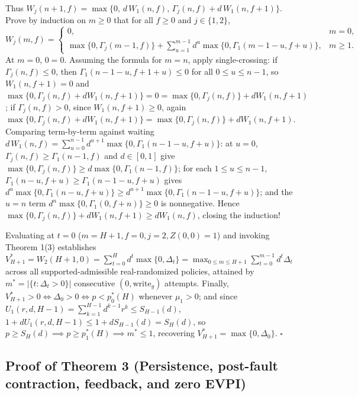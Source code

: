 \documentclass[11pt,a4paper]{article}
\begin{document}
Thus
\(W_j(n+1, f) = \max\{0,\, d\,W_1(n, f),\, \Gamma_j(n, f) + d\,W_1(n, f+1)\}\).
Prove by induction on \(m \ge 0\) that for all \(f \ge 0\) and
\(j \in \{1,2\}\),
\[W_j(m, f) = \begin{cases} 0, & m = 0, \\ \max\{0, \Gamma_j(m-1, f)\} + \sum_{u=1}^{m-1} d^u \max\{0, \Gamma_1(m - 1 - u, f + u)\}, & m \ge 1. \end{cases}\]
At \(m = 0\), \(0 = 0\). Assuming the formula for \(m = n\), apply
single-crossing: if \(\Gamma_j(n, f) \le 0\), then
\(\Gamma_1(n - 1 - u, f + 1 + u) \le 0\) for all \(0 \le u \le n - 1\),
so \(W_1(n, f+1) = 0\) and
\(\max\{0, \Gamma_j(n, f) + d W_1(n, f+1)\} = 0 = \max\{0, \Gamma_j(n, f)\} + d W_1(n, f+1)\);
if \(\Gamma_j(n, f) > 0\), since \(W_1(n, f+1) \ge 0\), again
\(\max\{0, \Gamma_j(n, f) + d W_1(n, f+1)\} = \max\{0, \Gamma_j(n, f)\} + d W_1(n, f+1)\).
Comparing term-by-term against waiting
\(d\,W_1(n, f) = \sum_{u=0}^{n-1} d^{u+1}\max\{0, \Gamma_1(n - 1 - u, f + u)\}\):
at \(u = 0\), \(\Gamma_j(n, f) \ge \Gamma_1(n-1, f)\) and
\(d \in [0,1]\) give
\(\max\{0, \Gamma_j(n, f)\} \ge d\max\{0, \Gamma_1(n-1, f)\}\); for each
\(1 \le u \le n-1\),
\(\Gamma_1(n - u, f + u) \ge \Gamma_1(n - 1 - u, f + u)\) gives
\(d^u\max\{0, \Gamma_1(n - u, f + u)\} \ge d^{u+1}\max\{0, \Gamma_1(n - 1 - u, f + u)\}\);
and the \(u = n\) term \(d^n\max\{0, \Gamma_1(0, f+n)\} \ge 0\) is
nonnegative. Hence
\(\max\{0, \Gamma_j(n,f)\} + d W_1(n, f+1) \ge d W_1(n, f)\), closing
the induction!

Evaluating at \(t = 0\) (\(m = H + 1, f = 0, j = 2, Z(0,0) = 1\)) and
invoking Theorem 1(3) establishes
\(V_{H+1}^* = W_2(H+1, 0) = \sum_{t=0}^H d^t \max\{0, \Delta_t\} = \max_{0 \le m \le H+1} \sum_{t=0}^{m-1} d^t \Delta_t\)
across all supported-admissible real-randomized policies, attained by
\(m^* = |\{t : \Delta_t > 0\}|\) consecutive \((0, \mathrm{write}_g)\)
attempts. Finally, \(V_{H+1}^* > 0 \iff \Delta_0 > 0 \iff p < p_0^*(H)\)
whenever \(\mu_1 > 0\); and since
\(U_1(r, d, H-1) = \sum_{k=1}^{H-1} d^{k-1} r^k \le S_{H-1}(d)\),
\(1 + d U_1(r, d, H-1) \le 1 + d S_{H-1}(d) = S_H(d)\), so
\(p \ge S_H(d) \implies p \ge p_1^*(H) \implies m^* \le 1\), recovering
\(V_{H+1}^* = \max\{0, \Delta_0\}\). \(\square\)

\subsection{Proof of Theorem 3 (Persistence, post-fault contraction,
feedback, and zero
EVPI)}\label{proof-of-theorem-3-persistence-post-fault-contraction-feedback-and-zero-evpi}
\end{document}
